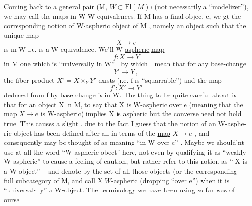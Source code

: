 Coming back to a general pair (M, $W\subset \mathrm{Fl}(M)$) (not necessarily a
``modelizer''), we may call the maps in W W-equivalences. If M has a
final object e, we gt the corresponding notion of W-\uline{aspheric} \uline{object} of
M , namely an object such that the unique map
\[ X \longrightarrow e \]
is in W i.e. is a W-equivalence. We'll   W-\uline{aspheric} \uline{map}
\[ f\colon X \longrightarrow Y \]
in M   one which is ``universally in W'' , by which I mean
that for any base-change
\[ Y' \longrightarrow Y \ , \]
the fiber product $X'=X\times_Y Y'$ exists (i.e. f is ``squarrable'') and the
map
\[ f'\colon X' \longrightarrow Y' \]
deduced from f by base change is in W. The thing to be quite careful
about is that for an object X in M, to say that X is W-\uline{aspheric over} e
(meaning that the \uline{map} $X \longrightarrow e$ is W-aspheric) implies X is aspheric 
 but the converse need not hold true. This causes a slight   
 , due to the fact I guess that the notion of an W-asphe-%
ric object has been defined after all in terms of the \uline{map} $X \longrightarrow e$ , and
consequently may be thought of as meaning  ``in W over e'' . Maybe we
should'nt use at all the word ``W-aspheric obect'' here, not even by
qualifying it as ``weakly W-aspheric'' to cause a feeling of caution, but
rather refer to this notion as `` X is a W-object'' -- and denote by 
the set of all those objects (or the corresponding full subcategory of M\hand{)},
and  call X $\underline{W}$-aspheric (dropping ``over e'')\hand{*} when it is ``universal-%
ly'' a W-object. The terminology we have been using so far was of ourse
